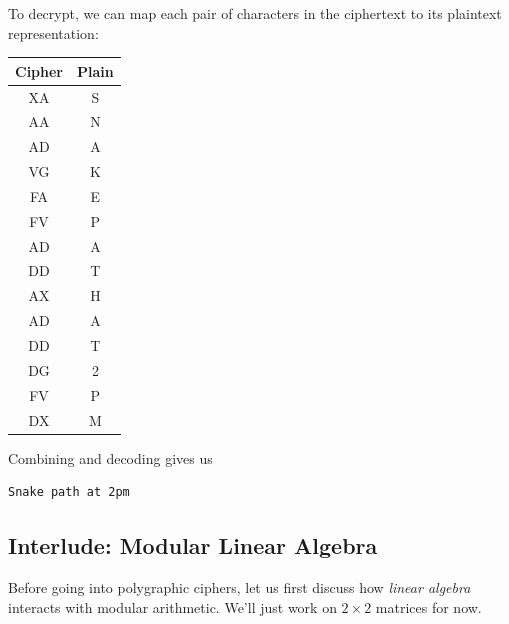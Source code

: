 \documentclass[letterpaper]{article}
\newcommand{\0}{\mathbf{0}}
\begin{document}
\begin{mdframed}
\begin{enumerate}[(a)]
        \begin{mdframed}
            To decrypt, we can map each pair of characters in the ciphertext to its plaintext representation:
            \begin{center}
                \begin{tabular}{c|c}
                    \textbf{Cipher} & \textbf{Plain} \\ 
                    \hline 
                    XA              & S \\
                    AA              & N \\
                    AD              & A \\
                    VG              & K \\
                    FA              & E \\
                    FV              & P \\
                    AD              & A \\
                    DD              & T \\
                    AX              & H \\
                    AD              & A \\
                    DD              & T \\
                    DG              & 2 \\
                    FV              & P \\
                    DX              & M 
                \end{tabular} 
            \end{center}
            Combining and decoding gives us 
            \begin{mdframed}
                \begin{verbatim}
Snake path at 2pm\end{verbatim}
            \end{mdframed}
        \end{mdframed}
    \end{enumerate}
\end{mdframed}


\subsection{Interlude: Modular Linear Algebra}
Before going into polygraphic ciphers, let us first discuss how \emph{linear algebra} interacts with modular arithmetic. We'll just work on $2 \times 2$ matrices for now.
\end{document}
